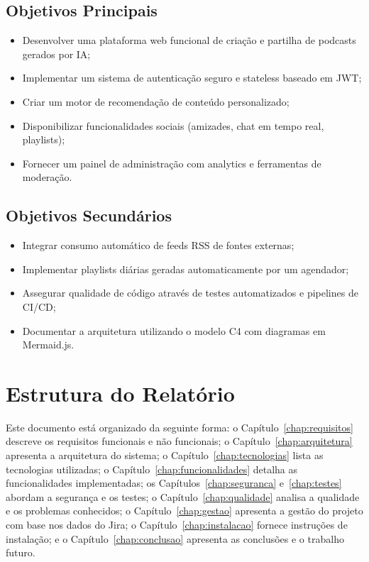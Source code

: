\documentclass[12pt, a4paper]{report}
\begin{document}
\subsection{Objetivos Principais}
\begin{itemize}
  \item Desenvolver uma plataforma web funcional de criação e partilha de podcasts gerados por IA;
  \item Implementar um sistema de autenticação seguro e stateless baseado em JWT;
  \item Criar um motor de recomendação de conteúdo personalizado;
  \item Disponibilizar funcionalidades sociais (amizades, chat em tempo real, playlists);
  \item Fornecer um painel de administração com analytics e ferramentas de moderação.
\end{itemize}

\subsection{Objetivos Secundários}
\begin{itemize}
  \item Integrar consumo automático de feeds RSS de fontes externas;
  \item Implementar playlists diárias geradas automaticamente por um agendador;
  \item Assegurar qualidade de código através de testes automatizados e pipelines de CI/CD;
  \item Documentar a arquitetura utilizando o modelo C4 com diagramas em Mermaid.js.
\end{itemize}

\section{Estrutura do Relatório}

Este documento está organizado da seguinte forma: o Capítulo~\ref{chap:requisitos}
descreve os requisitos funcionais e não funcionais; o Capítulo~\ref{chap:arquitetura}
apresenta a arquitetura do sistema; o Capítulo~\ref{chap:tecnologias} lista as
tecnologias utilizadas; o Capítulo~\ref{chap:funcionalidades} detalha as
funcionalidades implementadas; os Capítulos~\ref{chap:seguranca}
e~\ref{chap:testes} abordam a segurança e os testes; o
Capítulo~\ref{chap:qualidade} analisa a qualidade e os problemas conhecidos;
o Capítulo~\ref{chap:gestao} apresenta a gestão do projeto com base nos dados do Jira;
o Capítulo~\ref{chap:instalacao} fornece instruções de instalação; e o
Capítulo~\ref{chap:conclusao} apresenta as conclusões e o trabalho futuro.
\end{document}
